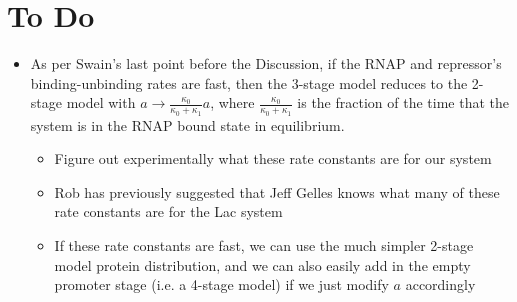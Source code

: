 \section{To Do}

\begin{itemize}	
%		
%		
	
	\item As per Swain's last point before the Discussion, if the RNAP and repressor's binding-unbinding rates are fast, then the 3-stage model reduces to the 2-stage model with $a \to \frac{\kappa_0}{\kappa_0 + \kappa_1} a$, where $\frac{\kappa_0}{\kappa_0 + \kappa_1}$ is the fraction of the time that the system is in the RNAP bound state in equilibrium.
	\begin{itemize}
		\item Figure out experimentally what these rate constants are for our system
		
		\item Rob has previously suggested that Jeff Gelles knows what many of these rate constants are for the Lac system
		
		\item If these rate constants are fast, we can use the much simpler 2-stage model protein distribution, and we can also easily add in the empty promoter stage (i.e. a 4-stage model) if we just modify $a$ accordingly
	\end{itemize}
	

\end{itemize}
